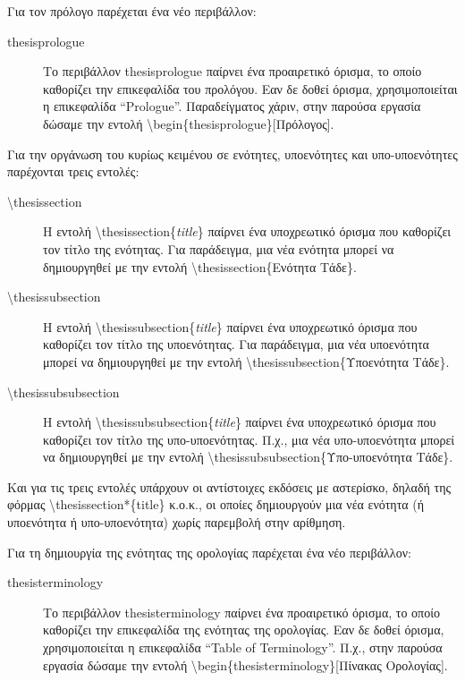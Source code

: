 \documentclass{dithesis}
\begin{document}
    Για τον πρόλογο παρέχεται ένα νέο περιβάλλον:
    \begin{description}
    \item[thesisprologue]
      Το περιβάλλον thesisprologue παίρνει ένα προαιρετικό όρισμα, το οποίο 
      καθορίζει την επικεφαλίδα του προλόγου.
      Εαν δε δοθεί όρισμα, χρησιμοποιείται η επικεφαλίδα ``Prologue''.
      Παραδείγματος χάριν, στην παρούσα εργασία δώσαμε την εντολή
      \textbackslash{begin}\{thesisprologue\}{[Πρόλογος]}.
    \end{description}

    Για την οργάνωση του κυρίως κειμένου σε ενότητες, υποενότητες και 
    υπο-υποενότητες παρέχονται τρεις εντολές:
    \begin{description}
    \item[\textbackslash{thesissection}]
      Η εντολή \textbackslash{thesissection}\{\textit{title}\} παίρνει ένα 
      υποχρεωτικό όρισμα που καθορίζει τον τίτλο της ενότητας.
      Για παράδειγμα, μια νέα ενότητα μπορεί να δημιουργηθεί με την εντολή
      \textbackslash{thesissection}\{Ενότητα Tάδε\}.
    \item[\textbackslash{thesissubsection}]
      Η εντολή \textbackslash{thesissubsection}\{\textit{title}\} παίρνει ένα 
      υποχρεωτικό όρισμα που καθορίζει τον τίτλο της υποενότητας.
      Για παράδειγμα, μια νέα υποενότητα μπορεί να δημιουργηθεί με την εντολή
      \textbackslash{thesissubsection}\{Υποενότητα Tάδε\}.
    \item[\textbackslash{thesissubsubsection}]
      Η εντολή \textbackslash{thesissubsubsection}\{\textit{title}\} παίρνει ένα 
      υποχρεωτικό όρισμα που καθορίζει τον τίτλο της υπο-υποενότητας.
      Π.χ., μια νέα υπο-υποενότητα μπορεί να δημιουργηθεί με την εντολή
      \textbackslash{thesissubsubsection}\{Υπο-υποενότητα Tάδε\}.
    \end{description}

    Και για τις τρεις εντολές υπάρχουν οι αντίστοιχες εκδόσεις με αστερίσκο,
    δηλαδή της φόρμας \textbackslash{thesissection*}\{title\} κ.ο.κ., οι οποίες
    δημιουργούν μια νέα ενότητα (ή υποενότητα ή υπο-υποενότητα) χωρίς παρεμβολή
    στην αρίθμηση.


    Για τη δημιουργία της ενότητας της ορολογίας παρέχεται ένα νέο περιβάλλον:
    \begin{description}
    \item[thesisterminology]
      Το περιβάλλον thesisterminology παίρνει ένα προαιρετικό όρισμα, το οποίο 
      καθορίζει την επικεφαλίδα της ενότητας της ορολογίας.
      Εαν δε δοθεί όρισμα, χρησιμοποιείται η επικεφαλίδα ``Table of Terminology''.
      Π.χ., στην παρούσα εργασία δώσαμε την εντολή
      \textbackslash{begin}\{thesisterminology\}{[Πίνακας Ορολογίας]}.
    \end{description}
\end{document}
